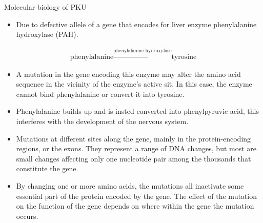 \documentclass[11pt,dvipsnames,ignorenonframetext,aspectratio=169]{beamer}
\providecommand{\tightlist}{%
  \setlength{\itemsep}{0pt}\setlength{\parskip}{0pt}}
\begin{document}
\begin{frame}{Molecular biology of PKU}
\protect\hypertarget{molecular-biology-of-pku}{}

\begin{itemize}
\tightlist
\item
  Due to defective allele of a gene that encodes for liver enzyme
  phenylalanine hydroxylase (PAH).
\end{itemize}

\[
\begin{aligned}
\textrm{phenylalanine} \xrightarrow{\text{phenylalanine hydroxylase}} \textrm{tyrosine}
\end{aligned}
\]

\begin{itemize}
\tightlist
\item
  A mutation in the gene encoding this enzyme may alter the amino acid
  sequence in the vicinity of the enzyme's active sit. In this case, the
  enzyme cannot bind phenylalanine or convert it into tyrosine.
\item
  Phenylalanine builds up and is insted converted into phenylpyruvic
  acid, this interferes with the development of the nervous system.
\end{itemize}

\end{frame}

\begin{frame}{}
\protect\hypertarget{section-2}{}

\begin{itemize}
\tightlist
\item
  Mutations at different sites along the gene, mainly in the
  protein-encoding regions, or the exons. They represent a range of DNA
  changes, but most are small changes affecting only one nucleotide pair
  among the thousands that constitute the gene.
\item
  By changing one or more amino acids, the mutations all inactivate some
  essential part of the protein encoded by the gene. The effect of the
  mutation on the function of the gene depends on where within the gene
  the mutation occurs.
\end{itemize}

\end{frame}
\end{document}
